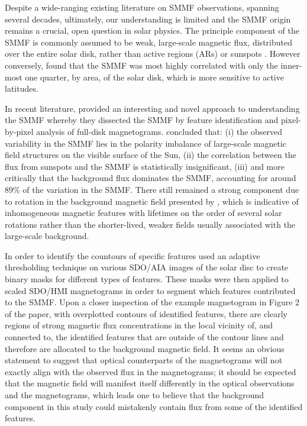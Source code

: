 Despite a wide-ranging existing literature on SMMF observations, spanning several decades, ultimately, our understanding is limited and the SMMF origin remains a crucial, open question in solar physics. The principle component of the SMMF is commonly assumed to be weak, large-scale magnetic flux, distributed over the entire solar disk, rather than active regions (ARs) or sunspots \citep{severny_time_1971, scherrer_mean_1977, xiang_ensemble_2016}. However conversely, \citet{scherrer_mean_1972} found that the SMMF was most highly correlated with only the inner-most one quarter, by area, of the solar disk, which is more sensitive to active latitudes.

In recent literature, \citet{bose_variability_2018} provided an interesting and novel approach to understanding the SMMF whereby they dissected the SMMF by feature identification and pixel-by-pixel analysis of full-disk magnetograms. \citet{bose_variability_2018} concluded that: (i) the observed variability in the SMMF lies in the polarity imbalance of large-scale magnetic field structures on the visible surface of the Sun, (ii) the correlation between the flux from sunspots and the SMMF is statistically insignificant, (iii) and more critically that the background flux dominates the SMMF, accounting for around $89 \%$ of the variation in the SMMF. There still remained a strong component due to rotation in the background magnetic field presented by \citet{bose_variability_2018}, which is indicative of inhomogeneous magnetic features with lifetimes on the order of several solar rotations rather than the shorter-lived, weaker fields usually associated with the large-scale background. 

In order to identify the countours of specific features \citet{bose_variability_2018} used an adaptive thresholding technique on various SDO/AIA images of the solar disc to create binary masks for different types of features. These masks were then applied to scaled SDO/HMI magnetograms in order to segment which features contributed to the SMMF. Upon a closer inspection of the example magnetogram in Figure 2 of the paper, with overplotted contours of identified features, there are clearly regions of strong magnetic flux concentrations in the local vicinity of, and connected to, the identified features that are outside of the contour lines and therefore are allocated to the background magnetic field. It seems an obvious statement to suggest that optical counterparts of the magnetograms will not exactly align with the observed flux in the magnetograms; it should be expected that the magnetic field will manifest itself differently in the optical observations and the magnetograms, which leads one to believe that the background component in this study could mistakenly contain flux from some of the identified features.

